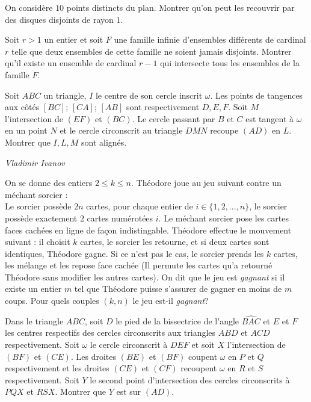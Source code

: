 \begin{exo}{}
On considère $10$ points distincts du plan. Montrer qu'on peut les recouvrir par des disques disjoints de rayon $1$.
\end{exo}

\begin{exo}{}
Soit $r>1$ un entier et soit $F$ une famille infinie d'ensembles différents de cardinal $r$ telle que deux ensembles de cette famille ne soient jamais disjoints. Montrer qu'il existe un ensemble de cardinal $r-1$ qui intersecte tous les ensembles de la famille $F$.
\end{exo}


\begin{exo}{}
Soit $ABC$ un triangle, $I$ le centre de son cercle inscrit $\omega$. Les points de tangences
aux côtés $[BC]$; $[CA]$; $[AB]$ sont respectivement $D,E, F$. Soit $M$ l’intersection de $(EF)$ et $(BC)$.
Le cercle passant par $B$ et $C$ est tangent à $\omega$ en un point $N$ et le cercle circonscrit au triangle
$DMN$ recoupe $(AD)$ en $L$. Montrer que $I,L,M$ sont alignés.

\medskip
\textit{Vladimir Ivanov}
\end{exo}




\begin{exo}{}
On se donne des entiers $2\le k\le n$. Théodore joue au jeu suivant contre un méchant sorcier : \\
Le sorcier possède $2n$ cartes, pour chaque entier de $i\in \{1,2,...,n\}$, le sorcier possède exactement $2$ cartes numérotées $i$. Le méchant sorcier pose les cartes faces cachées en ligne de façon indistingable. Théodore effectue le mouvement suivant : il choisit $k$ cartes, le sorcier les retourne, et si deux cartes sont identiques, Théodore gagne. Si ce n'est pas le cas, le sorcier prends les $k$ cartes, les mélange et les repose face cachée (Il permute les cartes qu'a retourné Théodore sans modifier les autres cartes). On dit que le jeu est \textit{gagnant} si il existe un entier $m$ tel que Théodore puisse s'assurer de gagner en moins de $m$ coups. Pour quels couples $(k,n)$ le jeu est-il \textit{gagnant}?

\end{exo}

\begin{exo}{}
Dans le triangle $ABC$, soit $D$ le pied de la bissectrice de l'angle $\widehat{BAC}$ et $E$ et $F$ les centres respectifs des cercles circonscrits aux triangles $ABD$ et $ACD$ respectivement. Soit $\omega$ le cercle circonscrit à $DEF$ et soit $X$ l'intersection de $(BF)$ et $(CE)$. Les droites $(BE)$ et $(BF)$ coupent $\omega$ en $P$ et $Q$ respectivement et les droites $(CE)$ et $(CF)$ recoupent $\omega$ en $R$ et $S$ respectivement. Soit $Y$ le second point d'intersection des cercles circonscrits à $PQX$ et $RSX$. Montrer que $Y$ est sur $(AD)$.
\end{exo}

